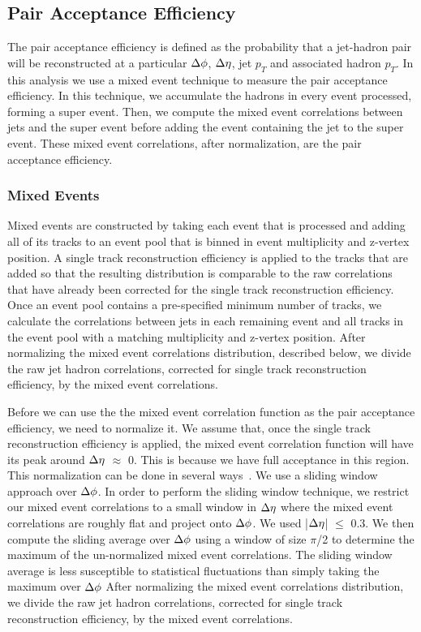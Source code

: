 \subsection*{Pair Acceptance Efficiency}

The pair acceptance efficiency is defined as the probability that a jet-hadron pair will be reconstructed at a particular $\Delta \phi$, $\Delta \eta$, jet $p_T$ and associated hadron $p_T$. In this analysis we use a mixed event technique to measure the pair acceptance efficiency. In this technique, we accumulate the hadrons in every event processed, forming a super event. Then, we compute the mixed event correlations between jets and the super event before adding the event containing the jet to the super event. These mixed event correlations, after normalization, are the pair acceptance efficiency. 

\subsubsection*{Mixed Events}

Mixed events are constructed by taking each event that is processed and adding all of its tracks to an event pool that is binned in event multiplicity and z-vertex position. A single track reconstruction efficiency is applied to the tracks that are added so that the resulting distribution is comparable to the raw correlations that have already been corrected for the single track reconstruction efficiency. Once an event pool contains a pre-specified minimum number of tracks, we calculate the correlations between jets in each remaining event and all tracks in the event pool with a matching multiplicity and z-vertex position. After normalizing the mixed event correlations distribution, described below, we divide the raw jet hadron correlations, corrected for single track reconstruction efficiency, by the mixed event correlations.

Before we can use the the mixed event correlation function as the pair acceptance efficiency, we need to normalize it. We assume that, once the single track reconstruction efficiency is applied, the mixed event correlation function will have its peak around $\Delta \eta$ $\approx$ 0. This is because we have full acceptance in this region. This normalization can be done in several ways~\cite{EhlersThesis}. We use a sliding window approach over $\Delta \phi$. In order to perform the sliding window technique, we restrict our mixed event correlations to a small window in $\Delta \eta$ where the mixed event correlations are roughly flat and project onto $\Delta \phi$. We used |$\Delta \eta$| $\leq$ 0.3. We then compute the sliding average over $\Delta \phi$ using a window of size $\pi$/2 to determine the maximum of the un-normalized mixed event correlations. The sliding window average is less susceptible to statistical fluctuations than simply taking the maximum over $\Delta \phi$ After normalizing the mixed event correlations distribution, we divide the raw jet hadron correlations, corrected for single track reconstruction efficiency, by the mixed event correlations.

